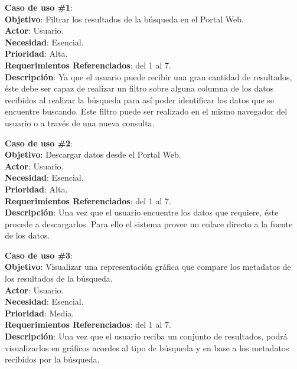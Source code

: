 \noindent\textbf{Caso de uso \#1}: \\
\textbf{Objetivo}: Filtrar los resultados de la búsqueda en el Portal Web. \\
\textbf{Actor}: Usuario. \\
\textbf{Necesidad}: Esencial. \\
\textbf{Prioridad}: Alta. \\
\textbf{Requerimientos Referenciados}: del 1 al 7. \\
\textbf{Descripción}: Ya que el usuario puede recibir una gran cantidad de
resultados, éste debe ser capaz de realizar un filtro sobre alguna columna de
los datos recibidos al realizar la búsqueda para así poder identificar los
datos que se encuentre buscando. Este filtro puede ser realizado en el mismo
navegador del usuario o a través de una nueva consulta. 
\vspace{1.0cm}

\noindent\textbf{Caso de uso \#2}: \\
\textbf{Objetivo}: Descargar datos desde el Portal Web. \\
\textbf{Actor}: Usuario. \\
\textbf{Necesidad}: Esencial. \\
\textbf{Prioridad}: Alta. \\
\textbf{Requerimientos Referenciados}: del 1 al 7. \\
\textbf{Descripción}: Una vez que el usuario encuentre los datos que requiere, éste procede a descargarlos. Para ello el sistema provee un enlace directo a la fuente de los datos.
\vspace{1.0cm}

\noindent\textbf{Caso de uso \#3}: \\
\textbf{Objetivo}: Visualizar una representación gráfica que compare los metadatos de los resultados de la búsqueda. \\
\textbf{Actor}: Usuario. \\
\textbf{Necesidad}: Esencial. \\
\textbf{Prioridad}:  Media. \\
\textbf{Requerimientos Referenciados}: del 1 al 7. \\
\textbf{Descripción}: Una vez que el usuario reciba un conjunto de resultados, podrá visualizarlos en gráficos acordes al tipo de búsqueda y en base a los metadatos recibidos por la búsqueda.
\vspace{1.0cm}

